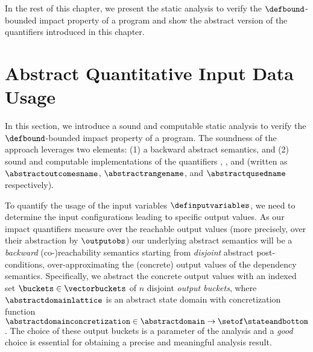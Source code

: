 In the rest of this chapter, we present the static analysis to verify the $\defbound$-bounded impact property of a program and show the abstract version of the quantifiers introduced in this chapter.

\section{Abstract Quantitative Input Data Usage}

In this section, we introduce a sound and computable static analysis to verify the $\defbound$-bounded impact property of a program.
The soundness of the approach leverages two elements: (1) a backward abstract semantics, and (2) sound and computable implementations of the quantifiers \outcomesname{}, \rangename{}, and \qusedname{} (written as $\abstractoutcomesname$, $\abstractrangename$, and $\abstractqusedname$ respectively).


To quantify the usage of the input variables $\definputvariables$, we need to determine the input configurations leading to specific output values.
As our impact quantifiers measure over the reachable output values (more precisely, over their abstraction by $\outputobs$) our underlying abstract semantics will be a \emph{backward} (co-)reachability semantics starting from \emph{disjoint} abstract post-conditions, over-approximating the (concrete) output values of the dependency semantics.
Specifically, we abstract the concrete output values with an indexed set $\buckets\in\vectorbuckets$ of $n$ disjoint \textit{output buckets}, where $\abstractdomainlattice$ is an abstract state domain with concretization function  $\abstractdomainconcretization\in\abstractdomain\to\setof\stateandbottom$. The choice of these output buckets is a parameter of the analysis and a \emph{good} choice is essential for obtaining a precise and meaningful analysis result.

